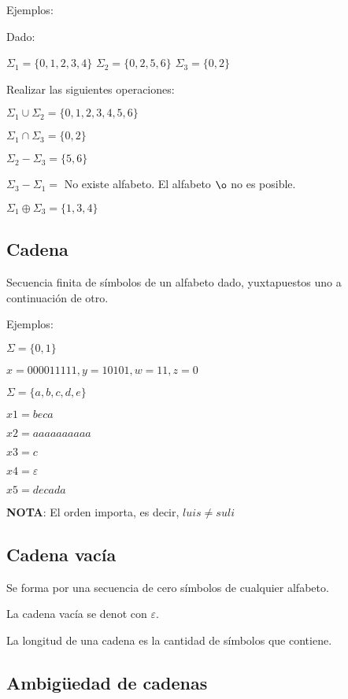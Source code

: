 \documentclass{article}
\begin{document}
Ejemplos:
\vspace{1em}

Dado:

$\Sigma_1 = \{0, 1, 2, 3, 4\}$
$\Sigma_2 = \{0, 2, 5, 6\}$
$\Sigma_3 = \{0, 2\}$
\vspace{1em}

Realizar las siguientes operaciones:

$\Sigma_1 \cup \Sigma_2 = \{0, 1, 2, 3, 4, 5, 6\}$

$\Sigma_1 \cap \Sigma_3 = \{0, 2\}$

$\Sigma_2 - \Sigma_3 = \{5, 6\}$

$\Sigma_3 - \Sigma_1 =$ No existe alfabeto. El alfabeto $\o$ no es posible.

$\Sigma_1 \oplus \Sigma_3 = \{1, 3, 4\}$

\subsection{Cadena}

Secuencia finita de símbolos de un alfabeto dado, yuxtapuestos uno a continuación
de otro.
\vspace{1em}

Ejemplos:
\vspace{1em}

$\Sigma = \{0, 1\}$

$x = 000011111, y = 10101, w = 11, z = 0$
\vspace{1em}

$\Sigma = \{a, b, c, d, e\}$

$x1 = beca$

$x2 = aaaaaaaaaa$

$x3 = c$

$x4 = \varepsilon$

$x5 = decada$
\vspace{1em}

\textbf{NOTA}: El orden importa, es decir, $luis \ne suli$

\subsection{Cadena vacía}

Se forma por una secuencia de cero símbolos de cualquier alfabeto.

La cadena vacía se denot con $\varepsilon$.

La longitud de una cadena es la cantidad de símbolos que contiene.

\subsection{Ambigüedad de cadenas}
\end{document}
